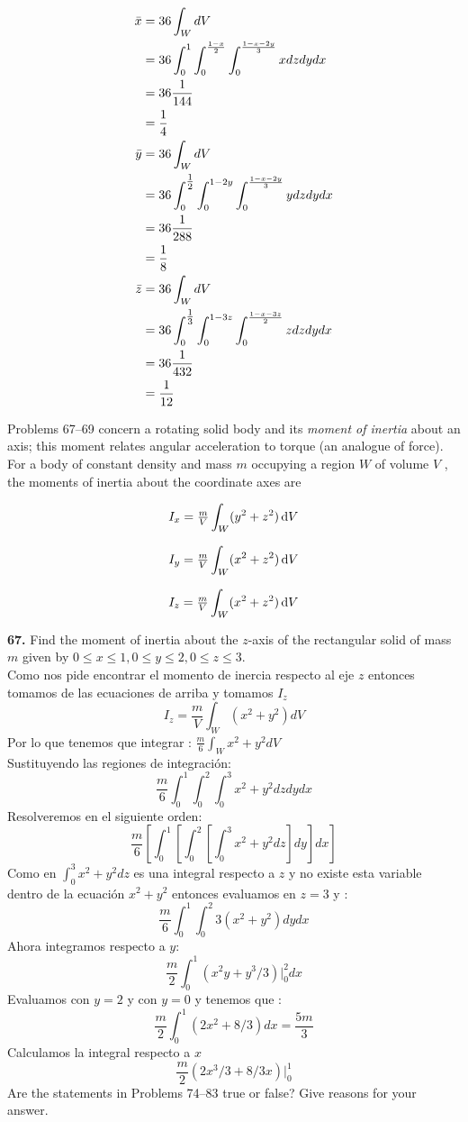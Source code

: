 \documentclass[11pt]{report}
\begin{document}
	\begin{align*}
		\bar{x}&=36\int_WdV\\
			   &=36\int_0^1\int_0^{\frac{1-x}{2}}\int_0^{\frac{1-x-2y}{3}}xdzdydx\\
			   &=36\frac{1}{144}\\
			   &=\frac{1}{4}\\
		\bar{y}&=36\int_WdV\\
			   &=36\int_0^{\tfrac{1}{2}}\int_0^{1-2y}\int_0^{\frac{1-x-2y}{3}}ydzdydx\\
			   &=36\frac{1}{288}\\
			   &=\frac{1}{8}\\
		\bar{z}&=36\int_WdV\\
			   &=36\int_0^{\tfrac{1}{3}}\int_0^{1-3z}\int_0^{\frac{1-x-3z}{2}}zdzdydx\\
			   &=36\frac{1}{432}\\
			   &=\frac{1}{12}\\
	\end{align*}


Problems 67–69 concern a rotating solid body and its \textit{moment of inertia}
about an axis; this moment relates angular acceleration to torque (an analogue
of force). For a body of constant density and mass $m$ occupying a region $W$
of volume $V$ , the moments of inertia about the coordinate axes are

\[I_x = \tfrac{m}{V} \int _W (y^2 + z^2) \, \text d V \]

\[I_y = \tfrac{m}{V} \int _W (x^2 + z^2) \, \text d V \]

\[I_z = \tfrac{m}{V} \int _W (x^2 + z^2) \, \text d V \]

\textbf{67.} Find the moment of inertia about the $z$-axis of the rectangular
solid of mass $m$ given by $0 \leq x \leq 1, 0 \leq y \leq 2, 0 \leq z \leq 3$. \\

Como nos  pide encontrar el momento de inercia respecto al eje $z$ entonces tomamos de las ecuaciones de arriba y tomamos $I_z$
\[I_{z} = \frac{m}{V} \int_W (x^2+y^2) dV\]
Por lo que tenemos que integrar : $\frac{m}{6} \int_W x^2+ y^2 dV$\\
Sustituyendo las regiones de integración:
\[\frac{m}{6} \int_0^1 \int_0^2 \int_0^3 x^2 + y^2 dz dy dx\]
Resolveremos en el siguiente orden:
\[\frac{m}{6} \left[ \int_0^1\left[ \int_0^2\left[ \int_0^3 x^2 + y^2 dz \right] dy \right] dx \right] \]
Como en $\int_0 ^3 x^2+ y^2 dz$ es una integral respecto a $z$ y no existe esta variable dentro
de la ecuación $x^2+ y^2$ entonces evaluamos en $z = 3$ y :
\[\frac{m}{6} \int_0^1 \int_0^2 3\left( x^2+y^2 \right) dy dx\]
Ahora integramos respecto a $y$:
\[\frac{m}{2} \int_0^1 \left( x^2y+ y^3/3 \right) \vert_0^2 dx\]
Evaluamos con $y= 2$ y con $y= 0$ y tenemos que :
\[\frac{m}{2} \int_0^1 \left( 2x^2+ 8/3 \right) dx = \frac{5m}{3}\]
Calculamos la integral respecto a $x$
\[\frac{m}{2} \left( 2x^3/3 + 8/3 x \right) \vert_0^1\]
Are the statements in Problems 74–83 true or false? Give reasons for your answer. \\
\end{document}

